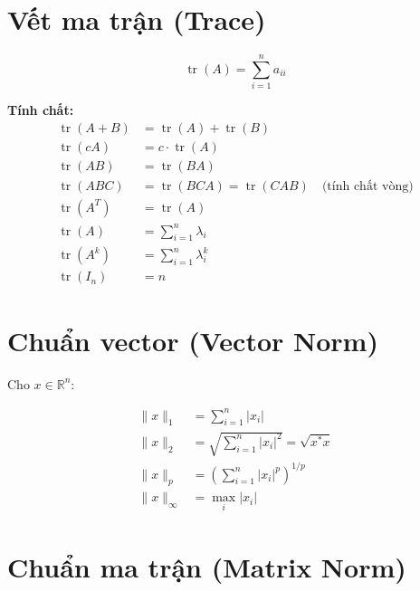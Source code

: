 
\section{Vết ma trận (Trace)}

\[
\operatorname{tr}(A) = \sum_{i=1}^n a_{ii}
\]

\textbf{Tính chất:}
\begin{align}
\operatorname{tr}(A + B) &= \operatorname{tr}(A) + \operatorname{tr}(B) \\
\operatorname{tr}(cA) &= c \cdot \operatorname{tr}(A) \\
\operatorname{tr}(AB) &= \operatorname{tr}(BA) \\
\operatorname{tr}(ABC) &= \operatorname{tr}(BCA) = \operatorname{tr}(CAB) \quad \text{(tính chất vòng)} \\
\operatorname{tr}(A^T) &= \operatorname{tr}(A) \\
\operatorname{tr}(A) &= \sum_{i=1}^n \lambda_i \\
\operatorname{tr}(A^k) &= \sum_{i=1}^n \lambda_i^k \\
\operatorname{tr}(I_n) &= n
\end{align}

\section{Chuẩn vector (Vector Norm)}

Cho $x \in \mathbb{R}^n$:

\begin{align}
\|x\|_1 &= \sum_{i=1}^n |x_i| \\
\|x\|_2 &= \sqrt{\sum_{i=1}^n |x_i|^2} = \sqrt{x^* x} \\
\|x\|_p &= \left(\sum_{i=1}^n |x_i|^p\right)^{1/p} \\
\|x\|_\infty &= \max_{i} |x_i|
\end{align}

\section{Chuẩn ma trận (Matrix Norm)}

